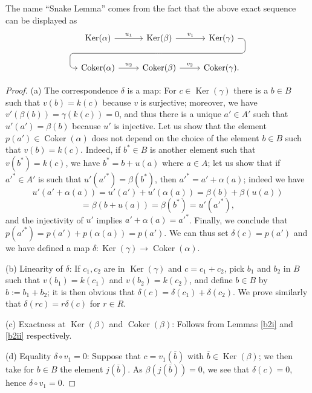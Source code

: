 \documentclass[parskip=half,fontsize=12pt]{scrartcl}%
\newcommand{\oo}{\operatorname}\newcommand{\ooo}{\operatorname*}
\newcommand{\Ker}{\operatorname{Ker}}\newcommand{\Coker}{\operatorname{Coker}}
\begin{document}
The name ``Snake Lemma'' comes from the fact that the above exact sequence can be displayed as 
$$%
\begin{tikzcd}
  \Ker(\alpha) \ar["u_1"]{r} & \Ker(\beta) \ar["v_1"]{r}
             \ar[draw=none]{d}[name=X, anchor=center]{}
    & \Ker(\gamma) \ar[rounded corners,
            to path={ -- ([xshift=2ex]\tikztostart.east)
                      |- (X.center) \tikztonodes
                      -| ([xshift=-2ex]\tikztotarget.west)
                      -- (\tikztotarget)}]{dll}[at end]{} \\      
  \Coker(\alpha) \ar["u_2"]{r} & \Coker(\beta) \ar["v_2"]{r} & \Coker(\gamma).
\end{tikzcd}
$$

\begin{proof} (a) The correspondence $\delta$ is a map: For $c\in\oo{Ker}(\gamma)$ there is a $b\in B$ such that $v(b)=k(c)$ because $v$ is surjective; moreover, we have $v'(\beta(b))=\gamma(k(c))=0$, and thus there is a unique $a'\in A'$ such that $u'(a')=\beta(b)$ because $u'$ is injective. Let us show that the element $p(a')\in\oo{Coker}(\alpha)$ does not depend on the choice of the element $b\in B$ such that $v(b)=k(c)$. Indeed, if $b^*\in B$ is another element such that $v(b^*)=k(c)$, we have $b^*=b+u(a)$ where $a\in A$; let us show that if $a'^*\in A'$ is such that $u'(a'^*)=\beta(b^*)$, then $a'^*=a'+\alpha(a)$; indeed we have 
$$
u'(a'+\alpha(a))=u'(a')+u'(\alpha(a))=\beta(b)+\beta(u(a))
$$ 
$$
=\beta(b+u(a))=\beta(b^*)=u'(a'^*),
$$ 
and the injectivity of $u'$ implies $a'+\alpha(a)=a'^*$. Finally, we conclude that $p(a'^*)=p(a')+p(\alpha(a))=p(a')$. We can thus set $\delta(c)=p(a')$ and we have defined a map $\delta:\oo{Ker}(\gamma)\to\oo{Coker}(\alpha)$.

(b) Linearity of $\delta$: If $c_1,c_2$ are in $\oo{Ker}(\gamma)$ and $c=c_1+c_2$, pick $b_1$ and $b_2$ in $B$ such that $v(b_1)=k(c_1)$ and $v(b_2)=k(c_2)$, and define $b\in B$ by $b:=b_1+b_2$; it is then obvious that $\delta(c)=\delta(c_1)+\delta(c_2)$. We prove similarly that $\delta(rc)=r\delta(c)$ for $r\in R$.

(c) Exactness at $\oo{Ker}(\beta)$ and $\oo{Coker}(\beta)$: Follows from Lemmas \ref{b2i} and \ref{b2ii} respectively.

(d) Equality $\delta\circ v_1=0$: Suppose that $c=v_1(\overline b)$ with $\overline b\in\oo{Ker}(\beta)$; we then take for $b\in B$ the element $j(\overline b)$. As $\beta(j(\overline b))=0$, we see that $\delta(c)=0$, hence $\delta\circ v_1=0$. 


\end{proof}
\end{document}

